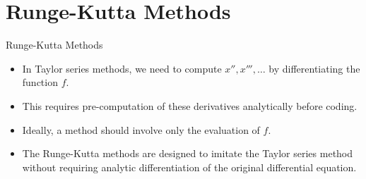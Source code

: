 \documentclass{beamer}
\begin{document}
\section[Runge-Kutta Methods]{Runge-Kutta Methods}
\begin{frame}{Runge-Kutta Methods}
\begin{itemize}
\item In Taylor series methods, we need to compute $x'',x''',\ldots$ by differentiating the function $f$.
\item This requires \alert{pre-computation} of these derivatives analytically before coding.
\item Ideally, a method should involve only the evaluation of $f$. 
\item The  Runge-Kutta methods are designed to imitate the Taylor series method \alert{without} requiring analytic differentiation of the original differential equation.
\end{itemize}
\end{frame}
\end{document}

